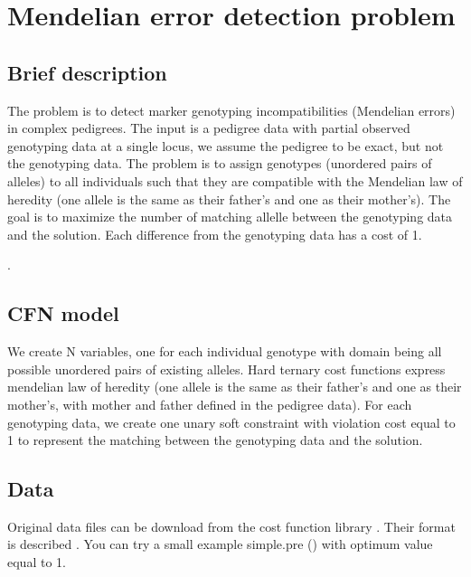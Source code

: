 \documentclass[letterpaper,10pt,openany,oneside,english]{sphinxmanual}
\begin{document}
\sphinxstepscope


\section{Mendelian error detection problem}
\label{\detokenize{examples/tuto_medp:mendelian-error-detection-problem}}\label{\detokenize{examples/tuto_medp:tuto-medp}}\label{\detokenize{examples/tuto_medp::doc}}



\subsection{Brief description}
\label{\detokenize{examples/tuto_medp:brief-description}}
\sphinxAtStartPar
The problem is to detect marker genotyping incompatibilities (Mendelian errors) in complex pedigrees.
The input is a pedigree data with partial observed genotyping data at a single locus, we assume the pedigree to be exact, but not the genotyping data.
The problem is to assign genotypes (unordered pairs of alleles) to all individuals such that they are compatible with the Mendelian law of heredity (one allele is the same as their father’s and one as their mother’s). The goal is to maximize the number of matching allelle between the genotyping data and the solution. Each difference from the genotyping data has a cost of 1.

\sphinxAtStartPar
{}.


\subsection{CFN model}
\label{\detokenize{examples/tuto_medp:cfn-model}}
\sphinxAtStartPar
We create N variables, one for each individual genotype with domain being all possible unordered pairs of existing alleles.
Hard ternary cost functions express mendelian law of heredity (one allele is the same as their father’s and one as their mother’s, with mother and father defined in the pedigree data).
For each genotyping data, we create one unary soft constraint with violation cost equal to 1 to represent the matching between the genotyping data and the solution.


\subsection{Data}
\label{\detokenize{examples/tuto_medp:data}}
\sphinxAtStartPar
Original data files can be download from the cost function library . Their format is described . You can try a small example simple.pre () with optimum value equal to 1.
\end{document}
